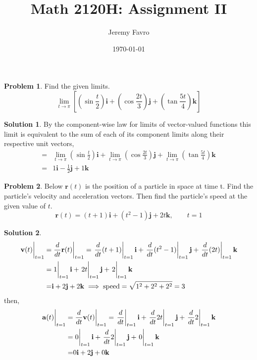 \documentclass[10pt]{article}
\title{Math 2120H: Assignment II}
\author{Jeremy Favro}
\date{\today}
\theoremstyle{definition}
\newtheorem{problem}{Problem}
\newtheorem{soln}{Solution}
\begin{document}
\maketitle

\begin{problem} Find the given limits.
$$\lim_{t \to \pi} \left[\left(\sin\frac{t}{2}\right)\mathbf{i}+\left(\cos\frac{2t}{3}\right)\mathbf{j}+\left(\tan\frac{5t}{4}\right)\mathbf{k}\right]$$
\end{problem}
\begin{soln}
  By the component-wise law for limits of vector-valued functions this limit is equivalent to the sum of each of its component limits along their respective unit vectors,
  \begin{align*}
    = & \lim_{t \to \pi}\left(\sin\frac{t}{2}\right)\mathbf{i}+\lim_{t \to \pi}\left(\cos\frac{2t}{3}\right)\mathbf{j}+\lim_{t \to \pi}\left(\tan\frac{5t}{4}\right)\mathbf{k} \\
    = & 1\mathbf{i}-\frac{1}{2}\mathbf{j}+1\mathbf{k}
  \end{align*}
\end{soln}

\begin{problem} Below $\mathbf{r}(t)$ is the position of a particle in space at time t. Find the particle's velocity and acceleration vectors.
Then find the particle's speed at the given value of $t$.
$$\mathbf{r}(t)=(t+1)\mathbf{i}+(t^2-1)\mathbf{j}+2t\mathbf{k}, \qquad t=1$$
\end{problem}
\begin{soln}
  \begin{align*}
    \eval{\mathbf{v}(t)}_{t=1}= & \eval{\frac{d}{dt}\mathbf{r}(t)}_{t=1}=\eval{\frac{d}{dt}(t+1)}_{t=1}\mathbf{i}+\eval{\frac{d}{dt}(t^2-1)}_{t=1}\mathbf{j}+\eval{\frac{d}{dt}(2t)}_{t=1}\mathbf{k} \\
    =                           & \eval{1}_{t=1}\mathbf{i}+\eval{2t}_{t=1}\mathbf{j}+\eval{2}_{t=1}\mathbf{k}                                                                                        \\
    =                           & \mathbf{i}+2\mathbf{j}+2\mathbf{k} \implies \text{speed}=\sqrt{1^2+2^2+2^2}=3
  \end{align*}
  then,
  \begin{align*}
    \eval{\mathbf{a}(t)}_{t=1}= & \eval{\frac{d}{dt}\mathbf{v}(t)}_{t=1}=\eval{\frac{d}{dt}}_{t=1}\mathbf{i}+\eval{\frac{d}{dt}2t}_{t=1}\mathbf{j}+\eval{\frac{d}{dt}2}_{t=1}\mathbf{k} \\
    =                           & \eval{0}_{t=1}\mathbf{i}+\eval{\frac{d}{dt}2}_{t=1}\mathbf{j}+\eval{0}_{t=1}\mathbf{k}                                                                \\
    =                           & 0\mathbf{i}+2\mathbf{j}+0\mathbf{k}
  \end{align*}
\end{soln}
\newpage
\end{document}
